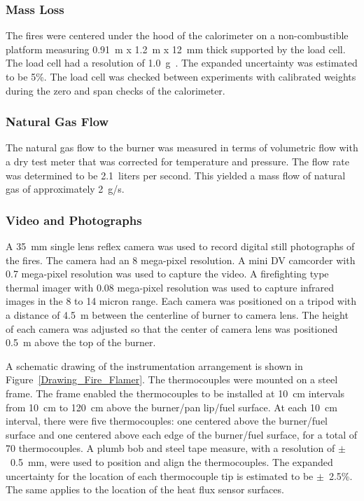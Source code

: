 \documentclass[twoside]{uocthesis}
\begin{document}
{\subsubsection{Mass Loss}

The fires were centered under the hood of the calorimeter on a non-combustible platform measuring 0.91~m x 1.2~m x 12~mm thick supported by the load cell.  The load cell had a resolution of 1.0~g~\cite{Mettler}. The expanded uncertainty was estimated to be 5\%.  The load cell was checked between experiments with calibrated weights during the zero and span checks of the calorimeter.

\subsubsection{Natural Gas Flow}

The natural gas flow to the burner was measured in terms of volumetric flow with a dry test meter that was corrected for temperature and pressure. The flow rate was determined to be 2.1~liters per second.  This yielded a mass flow of natural gas of approximately 2~g/s.  

\subsubsection{Video and Photographs}

A 35~mm single lens reflex camera was used to record digital still photographs of the fires.  The camera had an 8 mega-pixel resolution.  A mini DV camcorder with 0.7 mega-pixel resolution was used to capture the video.  A firefighting type thermal imager with 0.08 mega-pixel resolution was used to capture infrared images in the 8 to 14 micron range.  Each camera was positioned on a tripod with a distance of 4.5~m between the centerline of burner to camera lens.  The height of each camera was adjusted so that the center of camera lens was positioned 0.5~m above the top of the burner.

A schematic drawing of the instrumentation arrangement is shown in Figure~\ref{Drawing_Fire_Flamer}.  The thermocouples were mounted on a steel frame.  The frame enabled the thermocouples to be installed at 10~cm intervals from 10~cm to 120~cm above the burner/pan lip/fuel surface. At each 10~cm interval, there were five thermocouples: one centered above the burner/fuel surface and one centered above each edge of the burner/fuel surface, for a total of 70 thermocouples.  A plumb bob and steel tape measure, with a resolution of $\pm$~0.5~mm, were used to position and align the thermocouples.   The expanded uncertainty for the location of each thermocouple tip is estimated to be $\pm$~2.5\%.  The same applies to the location of the heat flux sensor surfaces.

}
\end{document}
